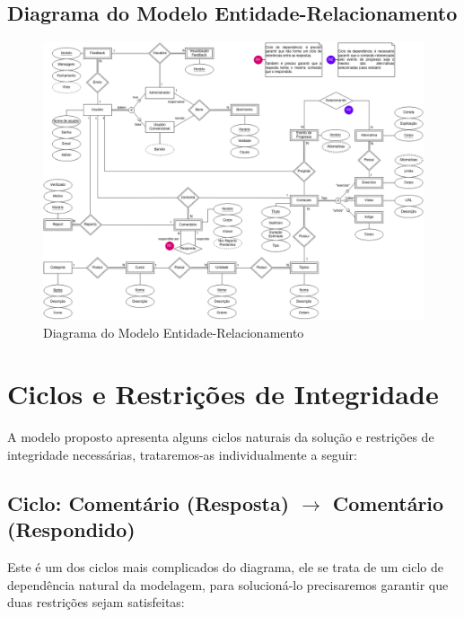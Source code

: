 \begin{landscape}
  \section{Diagrama do Modelo Entidade-Relacionamento}

  \begin{figure}[h]
    \includegraphics[height=0.76\textheight, center]{img/mer.png}
    \caption{Diagrama do Modelo Entidade-Relacionamento}
    \label{fig:mer}
  \end{figure}
\end{landscape}


\section{Ciclos e Restrições de Integridade}

A modelo proposto apresenta alguns ciclos naturais da solução e restrições de
integridade necessárias, trataremos-as individualmente a seguir:

\subsection{Ciclo: Comentário (Resposta) $\rightarrow$ Comentário (Respondido)}

Este é um dos ciclos mais complicados do diagrama, ele se trata de um ciclo de
dependência natural da modelagem, para solucioná-lo precisaremos garantir que
duas restrições sejam satisfeitas:

